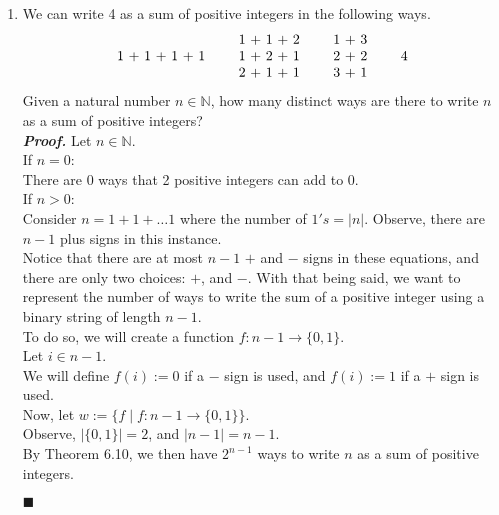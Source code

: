 \documentclass[11pt,a4paper]{article}
\begin{document}
\begin{enumerate}
    \item 
    We can write 4 as a sum of positive integers in the following ways. 
    \begin{equation*}
        \begin{tabular}{cccccccc}
                        &\quad& 1 + 1 + 2 &\quad& 1 + 3           \\
          1 + 1 + 1 + 1 &\quad& 1 + 2 + 1 &\quad& 2 + 2 &\quad& 4 \\
                        &\quad& 2 + 1 + 1 &\quad& 3 + 1           \\
        \end{tabular}
    \end{equation*}
    Given a natural number $n \in \mathbb{N} $, how many distinct ways are there to write $n$ as a sum of positive integers? \bigskip \\
    \emph{\textbf{Proof.}} Let $n \in \mathbb{N} $. \\
    If $n = 0 $: \\
    There are 0 ways that 2 positive integers can add to 0. \\
    If $n > 0 $: \\
    Consider $n = 1 + 1 + \dots 1 $ where the number of $1's = |n| $. Observe, there are $n - 1$ plus signs in this instance. \\
    Notice that there are at most $n - 1$ $+$ and $-$ signs in these equations, and there are only two choices: $+$, and $-$. With that being said, we want to represent the number of ways to write the sum of a positive integer using a binary string of length $n - 1$. \\
    To do so, we will create a function $f: n - 1 \rightarrow \{0, 1\} $. \\
    Let $i \in n - 1 $. \\
    We will define $f(i) := 0  $ if a $-$ sign is used, and $f(i) := 1 $ if a $+$ sign is used. \\
    Now, let $w := \{f \mid f: n - 1 \rightarrow \{0, 1\} \} $. \\
    Observe, $|\{0, 1\}| = 2 $, and $|n - 1| = n - 1 $. \\
    By Theorem 6.10, we then have $2^{n - 1} $ ways to write $n$ as a sum of positive integers.    
    \begin{flushright}
      $\blacksquare$
    \end{flushright}
    

\end{enumerate}
\end{document}
